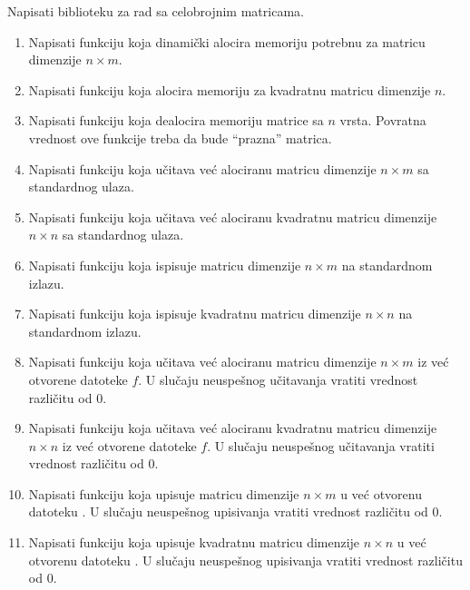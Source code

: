 \begin{Exercise}[label=2_19]
Napisati biblioteku za rad sa celobrojnim matricama. 
\begin{enumerate}
\item Napisati funkciju 
  koja dinamički alocira memoriju potrebnu za matricu dimenzije $n
  \times m$.
\item Napisati funkciju  koja alocira memoriju za kvadratnu matricu dimenzije $n$.
\item Napisati funkciju  koja dealocira memoriju matrice sa $n$ vrsta. Povratna vrednost
  ove funkcije treba da bude ``prazna'' matrica.
\item Napisati funkciju  koja učitava već alociranu matricu dimenzije $n \times m$ sa
  standardnog ulaza.
\item Napisati funkciju  koja učitava već alociranu kvadratnu matricu dimenzije
  $n \times n$ sa standardnog ulaza.
\item Napisati funkciju  koja ispisuje matricu dimenzije $n \times m$ na standardnom
  izlazu.
\item Napisati funkciju  koja ispisuje kvadratnu matricu dimenzije $n \times n$ na
  standardnom izlazu.
\item Napisati funkciju  koja učitava već alociranu matricu
  dimenzije $n \times m$ iz već otvorene datoteke $f$. U slučaju
  neuspešnog učitavanja vratiti vrednost različitu od $0$.
\item Napisati funkciju 
  koja učitava već alociranu kvadratnu matricu dimenzije $n \times n$ iz već
  otvorene datoteke $f$.  U slučaju neuspešnog učitavanja vratiti
  vrednost različitu od $0$.
\item Napisati funkciju  koja upisuje matricu dimenzije $n
  \times m$ u već otvorenu datoteku . U slučaju neuspešnog
  upisivanja vratiti vrednost različitu od $0$.
\item Napisati funkciju 
  koja upisuje kvadratnu matricu dimenzije $n \times n$ u već otvorenu datoteku
  . U slučaju neuspešnog upisivanja vratiti vrednost različitu od
  $0$.
\end{enumerate}


\end{Exercise}
